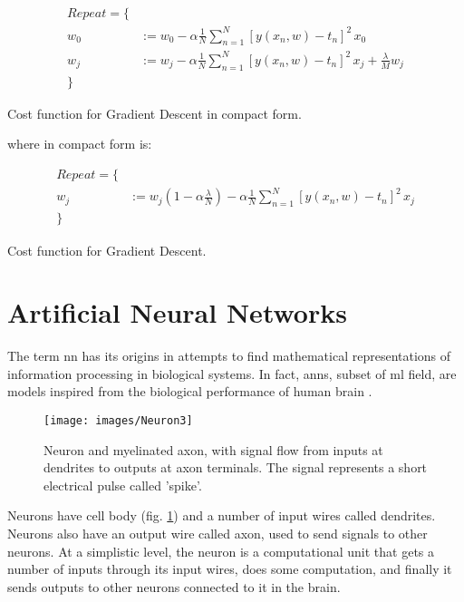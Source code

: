 \begin{Equation}[H]
	\centering
	\begin{equation} \label{eq:graddesc}
		\begin{aligned}
			Repeat = \{ \\
				w_0 &:= w_0 - \alpha \frac{1}{N} \sum_{n=1}^{N} [ y(x_n,w)-t_n ]^2 \, x_0 \\
				w_j &:= w_j - \alpha \frac{1}{N} \sum_{n=1}^{N} [ y(x_n,w)-t_n ]^2 \, x_j + \frac{\lambda}{M} w_j\\
			\}
		\end{aligned}
	\end{equation}
	\caption[Gradient Descent in compact form.]{Cost function for Gradient Descent in compact form.}
\end{Equation}

\noindent where in compact form is:
\begin{Equation}[H]
	\centering
	\begin{equation} \label{eq:graddesccompact}
	\begin{aligned}
		Repeat = \{ \\
			w_j &:= w_j(1-\alpha \frac{\lambda}{N}) - \alpha \frac{1}{N} \sum_{n=1}^{N} [ y(x_n,w)-t_n ]^2 \, x_j \\
		\}
	\end{aligned}
	\end{equation}
	\caption[Cost function for Gradient Descent.]{Cost function for Gradient Descent.}
\end{Equation}



\section{Artificial Neural Networks}
\label{sec:nn}
The term \gls{nn} has its origins in attempts to find mathematical representations of information processing in biological systems. In fact, \glspl{ann}, subset of \gls{ml} field, are models inspired from the biological performance of human brain \cite[]{inbook}. 

\begin{figure}[H]
	\centering
	\texttt{[image: images/Neuron3]}
	\caption[Image of a human neuron.]{Neuron and myelinated axon, with signal flow from inputs at dendrites to outputs at axon terminals. The signal represents a short electrical pulse called 'spike'.}
	\label{fig:bioneuron}
\end{figure}

\noindent Neurons have cell body (fig. \ref{fig:bioneuron}) and a number of input wires called dendrites. Neurons also have an output wire called axon, used to send signals to other neurons. At a simplistic level, the neuron is a computational unit that gets a number of inputs through its input wires, does some computation, and finally it sends outputs to other neurons connected to it in the brain. \\

